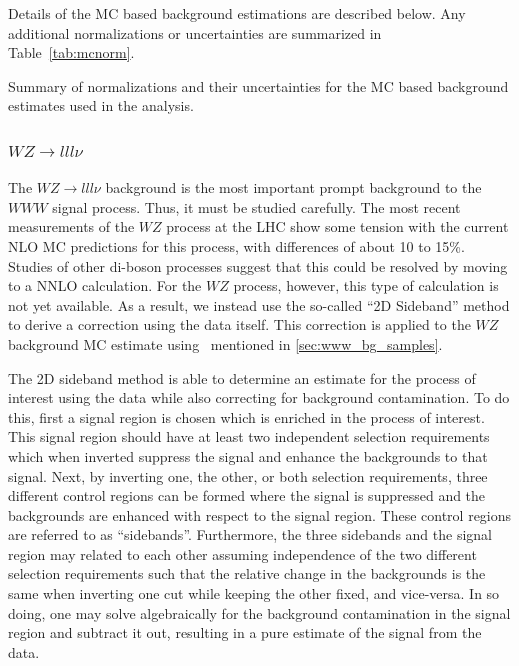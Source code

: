 
Details of the MC based background estimations are described below.
Any additional normalizations or uncertainties are summarized
in Table~\ref{tab:mcnorm}.

\begin{table}[htp]
\centering

\caption{Summary of normalizations and their uncertainties for the
MC based background estimates used in the analysis.}
\label{tab:mcnorm}
\end{table}



\subsubsection{$WZ\rightarrow lll\nu$}
\label{sec:wzbg}

The $WZ\rightarrow lll \nu$ background is the most important prompt background 
to the $WWW$ signal process. Thus, it must be studied carefully.
The most recent measurements of the $WZ$ process at the LHC
\cite{Aad:2012twa,Anger:1663539,CMS-PAS-SMP-12-006} 
show some tension with the current NLO MC predictions for this process, 
with differences of about 10 to 15\%. 
Studies of other di-boson processes 
\cite{Grazzini:2015nwa,Cascioli:2014yka}
suggest that this could be resolved by 
moving to a NNLO calculation.
For the $WZ$ process, however, this type of calculation is not yet available.
As a result, we instead use the so-called ``2D Sideband'' method
\cite{Aad:2013izg} to derive a correction using the data itself.
This correction is applied to the $WZ$ background MC estimate using
\powheg~mentioned in \sec\ref{sec:www_bg_samples}.

The 2D sideband method is able to determine an estimate
for the process of interest using the data while also correcting
for background contamination. 
To do this, first a signal region 
is chosen which is enriched in the process of interest.
This signal region should have at least two 
independent selection requirements which when inverted suppress
the signal and enhance the backgrounds to that signal.
Next, by inverting one, the other, or both selection requirements, 
three different control regions can be formed
where the signal is suppressed and the backgrounds are enhanced 
with respect to the signal region. 
These control regions are referred to as ``sidebands''.
Furthermore, the three sidebands and the signal region may
related to each other assuming independence of the two different selection
requirements such that the relative change in the backgrounds is the same
when inverting one cut while keeping the other fixed, and vice-versa.
In so doing, one may solve algebraically for the background contamination 
in the signal region and subtract it out, resulting in a pure
estimate of the signal from the data. 


